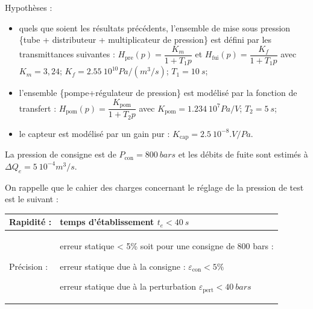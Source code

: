\documentclass[10pt,fleqn]{article} %
\begin{document}
\begin{multicols}{2}
%
Hypothèses : 
\begin{itemize}
\item quels que soient les résultats précédents, l’ensemble de mise sous pression \{tube + distributeur + multiplicateur de pression\} est défini par les transmittances suivantes :
$H_{\text{pre}} (p)=\dfrac{K_m}{1+T_1 p}$ et $H_{\text{fui}} (p)=\dfrac{K_f}{1+T_1 p}$
avec $K_m = 3,24$; $K_f = \SI{2,55}{10^{10} Pa/(m^3/s)}$; $T_1  =\SI{10}{s}$; 
\item l’ensemble \{pompe+régulateur de pression\} est modélisé par la fonction de transfert :
$H_{\text{pom}} (p)=\dfrac{K_{\text{pom}}}{1+T_2 p}$ avec $K_{\text{pom}} = \SI{1,234}{10^7 Pa/V}$; 	$T_2 = \SI{5}{s}$;
\item le capteur est modélisé par un gain pur :	$K_{\text{cap}}= \SI{2,5}{10^{-8}.V/Pa}$.
\end{itemize}

La pression de consigne est de $P_{\text{con}} = \SI{800}{bars}$ et les débits de fuite sont estimés à $\Delta Q_e = \SI{5}{10^{-4} m^3/s}$.

On rappelle que le cahier des charges concernant le réglage de la pression de test est le suivant :
\begin{center}
\begin{tabular}{|l|p{5cm}|}
\hline

Rapidité :	&temps d’établissement $t_e < \SI{40}{s}$ \\ \hline
Précision :&	erreur statique < 5\% soit pour une consigne de 800 bars :

erreur statique due à la consigne : $\varepsilon_{\text{con}} < 5\%$ 

erreur statique due à la perturbation $\varepsilon_{\text{pert}} < \SI{40}{bars}$ \\ \hline


\end{tabular}
\end{center}
\end{multicols}
\end{document}
